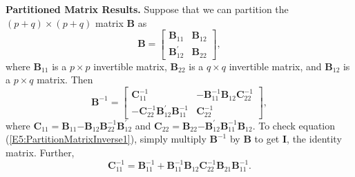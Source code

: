 \textbf{Partitioned Matrix Results.} Suppose that we can partition
the $(p+q)\times (p+q)$ matrix $\mathbf{B}$ as
\begin{equation*}
\mathbf{B}=%
\begin{bmatrix}
\mathbf{B}_{11} & \mathbf{B}_{12} \\
\mathbf{B}_{12}^{\prime } & \mathbf{B}_{22}%
\end{bmatrix},
\end{equation*}
where $\mathbf{B}_{11}$ is a $p\times p$ invertible matrix,
$\mathbf{B}_{22}$ is a $q\times q$ invertible matrix, and
$\mathbf{B}_{12}$ is a $p\times q$ matrix. Then
\begin{equation}\label{E5:PartitionMatrixInverse1}
\mathbf{B}^{-1}=%
\begin{bmatrix}
\mathbf{C}_{11}^{-1} &
- \mathbf{B}_{11}^{-1}\mathbf{B}_{12}\mathbf{C}_{22}^{-1} \\
- \mathbf{C}_{22}^{-1} \mathbf{B}_{12}^{\prime} \mathbf{B}_{11}^{-1}
& \mathbf{C}_{22}^{-1}
\end{bmatrix},
\end{equation}
where
$\mathbf{C}_{11}=\mathbf{B}_{11}\mathbf{-B}_{12}\mathbf{B}_{22}^{-1}
\mathbf{B}_{12}^{\prime }$ and
$\mathbf{C}_{22}=\mathbf{B}_{22}\mathbf{-B}_{12}^{\prime
}\mathbf{B}_{11}^{-1}\mathbf{B}_{12}$. To check equation
(\ref{E5:PartitionMatrixInverse1}), simply multiply
$\mathbf{B}^{-1}$ by $\mathbf{B}$ to get $\mathbf{I}$, the identity
matrix. Further,
\begin{equation}\label{E5:PartitionMatrixInverse2}
\mathbf{C}_{11}^{-1}  = \mathbf{B}_{11}^{-1} + \mathbf{B}_{11}^{-1}
\mathbf{B}_{12} \mathbf{C}_{22}^{-1} \mathbf{B}_{21}
\mathbf{B}_{11}^{-1}.
\end{equation}


